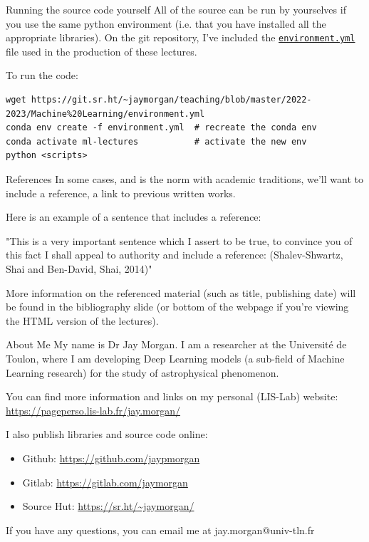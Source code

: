 \documentclass[10pt]{beamer}
\begin{document}
\begin{frame}[label={sec:orgb042edd},fragile]{Running the source code yourself}
 All of the source can be run by yourselves if you use the same python environment
(i.e. that you have installed all the appropriate libraries). On the git repository,
I've included the \href{https://git.sr.ht/\~jaymorgan/teaching/tree/master/item/2022-2023/Machine\%20Learning/environment.yml}{\texttt{environment.yml}} file used in the production of these lectures.

To run the code:

\begin{verbatim}
wget https://git.sr.ht/~jaymorgan/teaching/blob/master/2022-2023/Machine%20Learning/environment.yml
conda env create -f environment.yml  # recreate the conda env
conda activate ml-lectures           # activate the new env
python <scripts>
\end{verbatim}
\end{frame}

\begin{frame}[label={sec:org4a063c3}]{References}
In some cases, and is the norm with academic traditions, we'll want to include a
reference, a link to previous written works.

Here is an example of a sentence that includes a reference:

"This is a very important sentence which I assert to be true, to convince you of this
fact I shall appeal to authority and include a reference:
(Shalev-Shwartz, Shai and Ben-David, Shai, 2014)"

More information on the referenced material (such as title, publishing date) will be
found in the bibliography slide (or bottom of the webpage if you're viewing the HTML
version of the lectures).
\end{frame}

\begin{frame}[label={sec:org4a47783}]{About Me}
My name is Dr Jay Morgan. I am a researcher at the Université de Toulon, where I am
developing Deep Learning models (a sub-field of Machine Learning research) for the
study of astrophysical phenomenon.

You can find more information and links on my personal (LIS-Lab) website:
\url{https://pageperso.lis-lab.fr/jay.morgan/}

I also publish libraries and source code online:
\begin{itemize}
\item Github: \url{https://github.com/jaypmorgan}
\item Gitlab: \url{https://gitlab.com/jaymorgan}
\item Source Hut: \url{https://sr.ht/\~jaymorgan/}
\end{itemize}

If you have any questions, you can email me at jay.morgan@univ-tln.fr
\end{frame}
\end{document}
